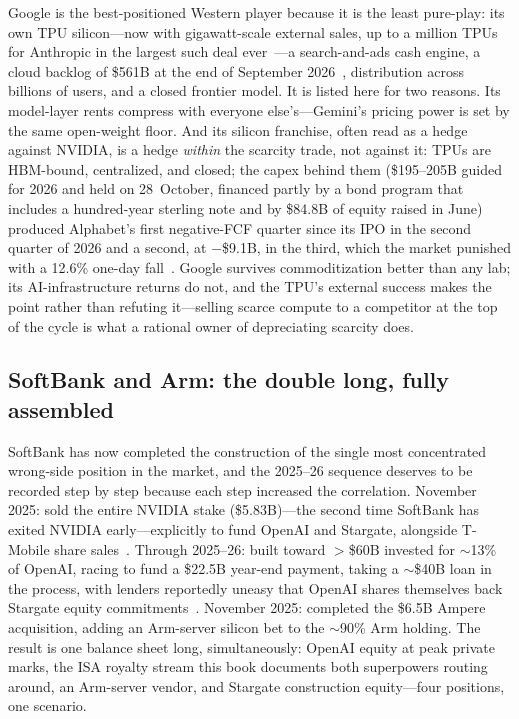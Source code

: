 Google is the best-positioned Western player because it is the least pure-play: its own TPU silicon---now with gigawatt-scale external sales, up to a million TPUs for Anthropic in the largest such deal ever~\cite{anthropic-econ}---a search-and-ads cash engine, a cloud backlog of \$561B at the end of September 2026~\cite{cap-alphabet-q3}, distribution across billions of users, and a closed frontier model. It is listed here for two reasons. Its model-layer rents compress with everyone else's---Gemini's pricing power is set by the same open-weight floor. And its silicon franchise, often read as a hedge against NVIDIA, is a hedge \emph{within} the scarcity trade, not against it: TPUs are HBM-bound, centralized, and closed; the capex behind them (\$195--205B guided for 2026 and held on 28~October, financed partly by a bond program that includes a hundred-year sterling note and by \$84.8B of equity raised in June) produced Alphabet's first negative-FCF quarter since its IPO in the second quarter of 2026 and a second, at $-$\$9.1B, in the third, which the market punished with a 12.6\% one-day fall~\cite{alphabet-fcf,hyperscaler-capex,cap-alphabet-q3}. Google survives commoditization better than any lab; its AI-infrastructure returns do not, and the TPU's external success makes the point rather than refuting it---selling scarce compute to a competitor at the top of the cycle is what a rational owner of depreciating scarcity does.

\subsection{SoftBank and Arm: the double long, fully assembled}

SoftBank has now completed the construction of the single most concentrated wrong-side position in the market, and the 2025--26 sequence deserves to be recorded step by step because each step increased the correlation. November 2025: sold the entire NVIDIA stake (\$5.83B)---the second time SoftBank has exited NVIDIA early---explicitly to fund OpenAI and Stargate, alongside T-Mobile share sales~\cite{softbank-nvidia-sale}. Through 2025--26: built toward $>$\$60B invested for $\sim$13\% of OpenAI, racing to fund a \$22.5B year-end payment, taking a $\sim$\$40B loan in the process, with lenders reportedly uneasy that OpenAI shares themselves back Stargate equity commitments~\cite{softbank-openai}. November 2025: completed the \$6.5B Ampere acquisition, adding an Arm-server silicon bet to the $\sim$90\% Arm holding. The result is one balance sheet long, simultaneously: OpenAI equity at peak private marks, the ISA royalty stream this book documents both superpowers routing around, an Arm-server vendor, and Stargate construction equity---four positions, one scenario.

